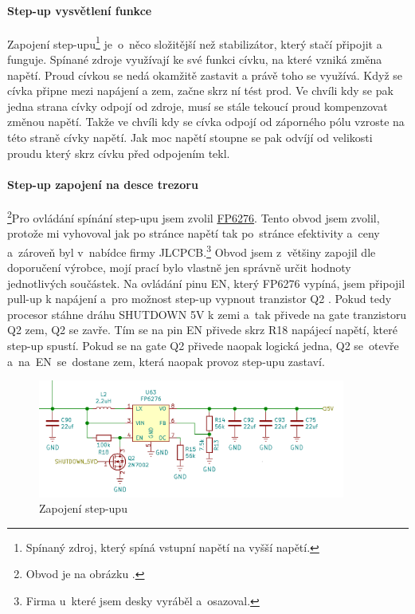 \paragraph*{Step-up vysvětlení funkce}
Zapojení step-upu\footnote{Spínaný zdroj, který spíná vstupní napětí na vyšší napětí.} je~o~něco složitější než stabilizátor, který stačí připojit a funguje. 
Spínané zdroje využívají ke své funkci cívku, na které vzniká změna napětí. Proud cívkou se nedá okamžitě zastavit a právě toho se využívá. 
Když se cívka připne mezi napájení a zem, začne skrz ní tést prod. Ve chvíli kdy se pak jedna strana cívky odpojí od zdroje, musí se stále tekoucí proud kompenzovat změnou napětí.
Takže ve chvíli kdy se cívka odpojí od záporného pólu vzroste na této straně cívky napětí. 
Jak moc napětí stoupne se pak odvíjí od velikosti proudu který skrz cívku před odpojením tekl.

\vspace{-5mm}

\paragraph*{Step-up zapojení na desce trezoru}\footnote{Obvod je na obrázku .}Pro ovládání spínání step-upu jsem zvolil \href{https://datasheet.lcsc.com/szlcsc/Feeling-Tech-FP6276AXR-G1_C83308.pdf}{FP6276}.
Tento obvod jsem zvolil, protože mi vyhovoval jak po stránce napětí tak po~stránce efektivity a~ceny a~zároveň byl v~nabídce firmy JLCPCB.\footnote{Firma u~které jsem desky vyráběl a~osazoval.}
Obvod jsem z~většiny zapojil dle doporučení výrobce, mojí prací bylo vlastně jen správně určit hodnoty 
jednotlivých součástek. Na ovládání pinu EN, který FP6276 vypíná, jsem připojil pull-up k napájení a~pro možnost step-up vypnout tranzistor Q2 \parencite{cj3134k}. 
Pokud tedy procesor stáhne dráhu SHUTDOWN 5V k zemi a~tak přivede na gate tranzistoru Q2 zem, 
Q2 se zavře. Tím se na pin EN přivede skrz R18 napájecí napětí, které step-up spustí. 
Pokud se na gate Q2 přivede naopak logická jedna, Q2 se~otevře a~na~EN~se~dostane zem, která naopak provoz step-upu zastaví.
\vspace{-5mm}
\begin{figure}[h]
    \centering
    \includegraphics[width=0.9\textwidth]{kapitoly/obrazky/E4/napajeni/step-up.png}
    \caption{Zapojení step-upu}
    \label{fig:E4-step-up}
\end{figure}

